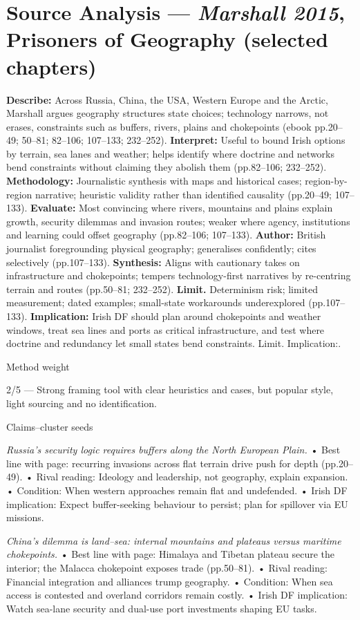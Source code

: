 \section*{Source Analysis — \textit{Marshall 2015}, Prisoners of Geography (selected chapters)}
\textbf{Describe:} Across Russia, China, the USA, Western Europe and the Arctic, Marshall argues geography structures state choices; technology narrows, not erases, constraints such as buffers, rivers, plains and chokepoints (ebook pp.20–49; 50–81; 82–106; 107–133; 232–252).
\textbf{Interpret:} Useful to bound Irish options by terrain, sea lanes and weather; helps identify where doctrine and networks bend constraints without claiming they abolish them (pp.82–106; 232–252).
\textbf{Methodology:} Journalistic synthesis with maps and historical cases; region-by-region narrative; heuristic validity rather than identified causality (pp.20–49; 107–133).
\textbf{Evaluate:} Most convincing where rivers, mountains and plains explain growth, security dilemmas and invasion routes; weaker where agency, institutions and learning could offset geography (pp.82–106; 107–133).
\textbf{Author:} British journalist foregrounding physical geography; generalises confidently; cites selectively (pp.107–133).
\textbf{Synthesis:} Aligns with cautionary takes on infrastructure and chokepoints; tempers technology-first narratives by re-centring terrain and routes (pp.50–81; 232–252).
\textbf{Limit.} Determinism risk; limited measurement; dated examples; small-state workarounds underexplored (pp.107–133).
\textbf{Implication:} Irish DF should plan around chokepoints and weather windows, treat sea lines and ports as critical infrastructure, and test where doctrine and redundancy let small states bend constraints. Limit. Implication:.

Method weight

2/5 — Strong framing tool with clear heuristics and cases, but popular style, light sourcing and no identification.

Claims–cluster seeds

\textit{Russia’s security logic requires buffers along the North European Plain.}
• Best line with page: recurring invasions across flat terrain drive push for depth (pp.20–49).
• Rival reading: Ideology and leadership, not geography, explain expansion.
• Condition: When western approaches remain flat and undefended.
• Irish DF implication: Expect buffer-seeking behaviour to persist; plan for spillover via EU missions.

\textit{China’s dilemma is land–sea: internal mountains and plateaus versus maritime chokepoints.}
• Best line with page: Himalaya and Tibetan plateau secure the interior; the Malacca chokepoint exposes trade (pp.50–81).
• Rival reading: Financial integration and alliances trump geography.
• Condition: When sea access is contested and overland corridors remain costly.
• Irish DF implication: Watch sea-lane security and dual-use port investments shaping EU tasks.

